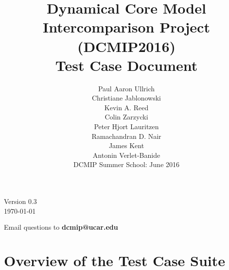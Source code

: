 \documentclass[times,doublespace]{fldauth}
\begin{document}
\setcounter{section}{-1}

\title{Dynamical Core Model Intercomparison Project (DCMIP2016) \\
 Test Case Document}
\author{Paul Aaron Ullrich \\ Christiane Jablonowski \\ Kevin A. Reed \\ Colin Zarzycki \\ Peter Hjort Lauritzen \\ Ramachandran D. Nair \\ James Kent \\Antonin Verlet-Banide \\ \vspace{3cm} DCMIP Summer School: June 2016}

\maketitle

\begin{center}
Version 0.3 \\
\today
\end{center}

\vspace{2cm}

\begin{center}
Email questions to \textbf{dcmip@ucar.edu}
\end{center}

\clearpage

\section*{Overview of the Test Case Suite}
\end{document}
